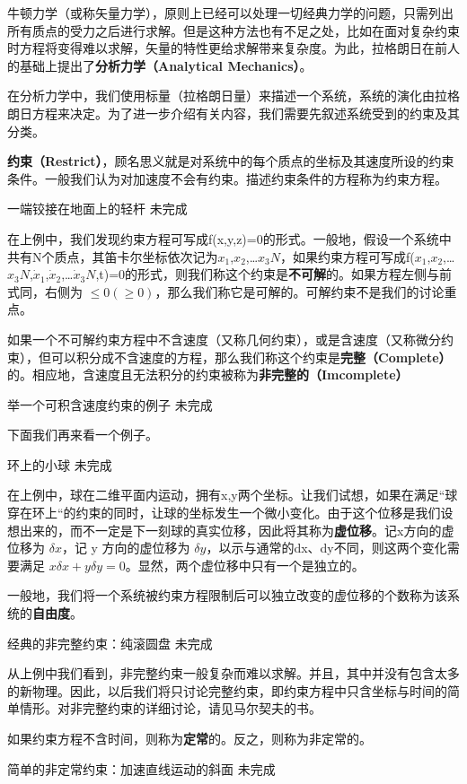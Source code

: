 
\begin{issues}
\issueDraft
\issueTODO
\end{issues}


牛顿力学（或称矢量力学），原则上已经可以处理一切经典力学的问题，只需列出所有质点的受力之后进行求解。但是这种方法也有不足之处，比如在面对复杂约束时方程将变得难以求解，矢量的特性更给求解带来复杂度。为此，拉格朗日在前人的基础上提出了\textbf{分析力学（Analytical Mechanics）}。

在分析力学中，我们使用标量（拉格朗日量）来描述一个系统，系统的演化由拉格朗日方程来决定。为了进一步介绍有关内容，我们需要先叙述系统受到的约束及其分类。

\textbf{约束（Restrict）}，顾名思义就是对系统中的每个质点的坐标及其速度所设的约束条件。一般我们认为对加速度不会有约束。描述约束条件的方程称为约束方程。

\begin{example}{一端铰接在地面上的轻杆}
未完成
\end{example}

在上例中，我们发现约束方程可写成f(x,y,z)=0的形式。一般地，假设一个系统中共有N个质点，其笛卡尔坐标依次记为$x
_1$,$x_2$,…$x_3N$，如果约束方程可写成f($x_1$,$x_2$,…$x_3N$,$\dot x_1$,$\dot x_2$,…$\dot x_3N$,t)=0的形式，则我们称这个约束是\textbf{不可解}的。如果方程左侧与前式同，右侧为 $\leq 0(\geqslant 0)$，那么我们称它是可解的。可解约束不是我们的讨论重点。

如果一个不可解约束方程中不含速度（又称几何约束），或是含速度（又称微分约束），但可以积分成不含速度的方程，那么我们称这个约束是\textbf{完整（Complete）}的。相应地，含速度且无法积分的约束被称为\textbf{非完整的（Imcomplete）}

\begin{example}{举一个可积含速度约束的例子}
未完成
\end{example}

下面我们再来看一个例子。

\begin{example}{环上的小球}
未完成
\end{example}

在上例中，球在二维平面内运动，拥有x,y两个坐标。让我们试想，如果在满足“球穿在环上“的约束的同时，让球的坐标发生一个微小变化。由于这个位移是我们设想出来的，而不一定是下一刻球的真实位移，因此将其称为\textbf{虚位移}。记x方向的虚位移为 $\delta x$，记 y 方向的虚位移为 $\delta y$，以示与通常的dx、dy不同，则这两个变化需要满足 $x\delta x+y\delta y=0$。显然，两个虚位移中只有一个是独立的。

一般地，我们将一个系统被约束方程限制后可以独立改变的虚位移的个数称为该系统的\textbf{自由度}。

\begin{example}{经典的非完整约束：纯滚圆盘}
未完成
\end{example}

从上例中我们看到，非完整约束一般复杂而难以求解。并且，其中并没有包含太多的新物理。因此，以后我们将只讨论完整约束，即约束方程中只含坐标与时间的简单情形。对非完整约束的详细讨论，请见马尔契夫的书。

如果约束方程不含时间，则称为\textbf{定常}的。反之，则称为非定常的。

\begin{example}{简单的非定常约束：加速直线运动的斜面}
未完成
\end{example}